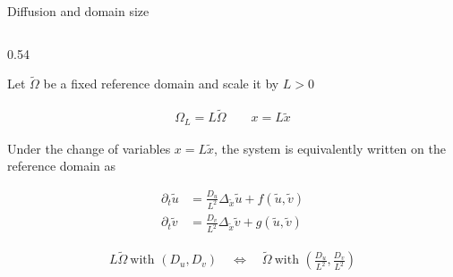 \begin{frame}{Diffusion and domain size}

  \vspace{-0.08cm}

  \begin{columns}[c,onlytextwidth]

    \begin{column}{0.54\textwidth}
      {\color{HydraMuted}\fontsize{7.4}{9.1}\selectfont
        Let $\widetilde\Omega$ be a fixed reference domain and scale it by $L>0$
      \par}

      \vspace{-0.34cm}

      {\color{HydraWhite}\fontsize{9.8}{12.5}\selectfont
      \begin{align*}
        \Omega_L=L\widetilde\Omega
        \qquad
        x=L\widetilde x
      \end{align*}
      }

      \vspace{-0.46cm}

      {\color{HydraMuted}\fontsize{7.4}{9.1}\selectfont
        Under the change of variables $x=L\widetilde x$, the system is
        equivalently written on the reference domain as
      \par}

      \vspace{-0.34cm}

      {\color{HydraWhite}\fontsize{8.4}{10.7}\selectfont
      \begin{align*}
        \partial_t\widetilde u
        &=
        \frac{D_u}{L^2}\Delta_{\widetilde x}\widetilde u
        +f(\widetilde u,\widetilde v)
        \\
        \partial_t\widetilde v
        &=
        \frac{D_v}{L^2}\Delta_{\widetilde x}\widetilde v
        +g(\widetilde u,\widetilde v)
      \end{align*}
      }

      \vspace{-0.50cm}

      {\color{HydraGold}\bfseries\fontsize{8.1}{10.3}\selectfont
      \begin{align*}
        L\widetilde\Omega\ \text{with }(D_u,D_v)
        \quad\Leftrightarrow\quad
        \widetilde\Omega\ \text{with }
        \left(\frac{D_u}{L^2},\frac{D_v}{L^2}\right)
      \end{align*}
      }
    \end{column}


\end{columns}
\end{frame}
